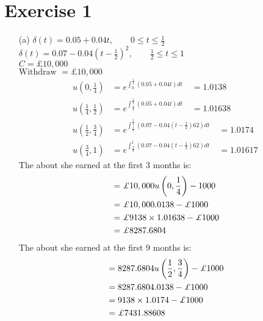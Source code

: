 \documentclass[12pt,a4paper]{article}
\begin{document}
\section*{Exercise 1}
\begin{enumerate}
\item[(a)]
	$
\delta(t)  = 0.05 + 0.04t, \qquad 0 \leq t \leq \frac{1}{2}
$\\
$ \delta(t)  =  0.07 -  0.04 \left( t  - \frac{1}{2}   \right)^2, \qquad \frac{1}{2} \leq t \leq 1  $\\
$   C =  \pounds 10,000 $\\
$ \text{Withdraw } =  \pounds 10,000 $
\begin{align*}
u \left( 0,  \frac{1}{4}   \right)   &=  e^{\int_0^{ \frac{1}{4} }  ( 0.05 + 0.04t )dt } \quad =  1.0138\\
u \left( \frac{1}{4} , \frac{1}{2}   \right)   &=  e^{\int_{\frac{1}{4}}^{ \frac{1}{2} }  ( 0.05 + 0.04t )dt } \quad =  1.01638\\
u \left( \frac{1}{2}  ,\frac{3}{4}   \right)   &=  e^{\int_{\frac{1}{2}}^{ \frac{3}{4} }  \left( 0.07 -  0.04 \left( t  - \frac{1}{2}   \right)62  \right)dt } \quad =  1.0174\\
u \left( \frac{3}{4}, 1  \right)   &=  e^{\int_{\frac{3}{4}}^1 \left( 0.07 -  0.04 \left( t  - \frac{1}{2}   \right)62  \right)dt } \quad =  1.01617
\end{align*}
The about she earned at the first 3 months is:\\
\begin{align*}
&=  \pounds  10,000 u \left(  0, \frac{1}{4}   \right) - 1000\\
&=  \pounds  10,000  \time  1.0138 -  \pounds  1000\\
&=  \pounds   9138 \times 1.01638 -  \pounds  1000 \\
&=  \pounds   8287.6804
\end{align*}
The about she earned at the first 9 months is:\\
\begin{align*}
&= 8287.6804 u \left( \frac{1}{2} , \frac{3}{4}   \right)  - \pounds  1000\\
&=  8287.6804 \time  1.0138 - \pounds  1000\\
&=  9138 \times 1.0174 -  \pounds  1000 \\
&= \pounds   7431.88608
\end{align*}


\end{enumerate}
\end{document}
